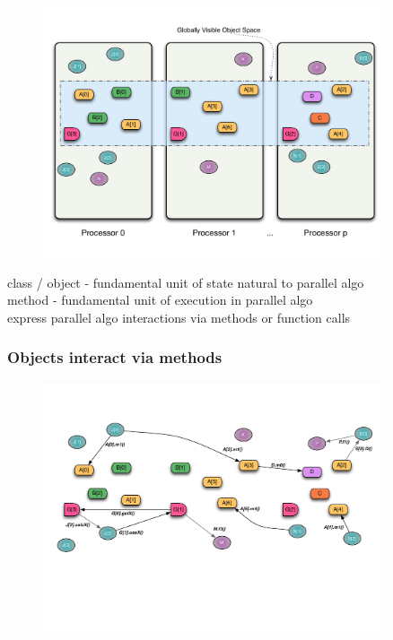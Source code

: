 \begin{frame}
  \frametitle{
  }
  \begin{figure}\includegraphics[width=0.9\textwidth]{../figures/progmodel/07-obj-programmer-view.pdf}\end{figure}
\end{frame}


\begin{frame}
    class / object - fundamental unit of state natural to parallel algo\\
    method - fundamental unit of execution in parallel algo\\
    express parallel algo interactions via methods or function calls
\end{frame}


\begin{frame}
  \frametitle{Objects interact via methods}
  \begin{figure}
    \includegraphics[width=0.9\textwidth]{../figures/progmodel/07-algo-via-objects-methods.pdf}
  \end{figure}
\end{frame}


